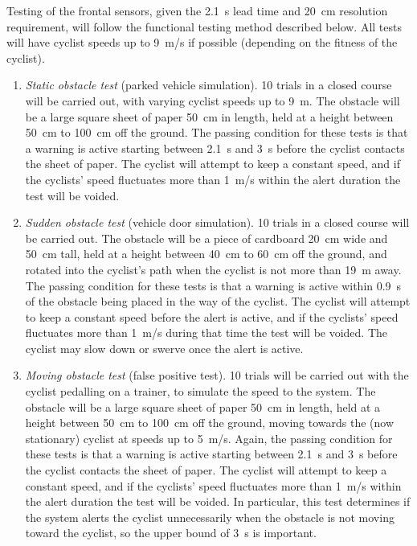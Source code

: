 \documentclass[journal]{IEEEtran}
\begin{document}
Testing of the frontal sensors, given the \SI{2.1}{\s} lead time and \SI{20}{\cm} resolution requirement, will follow the functional testing method described below. All tests will have cyclist speeds up to \SI{9}{\meter/\s} if possible (depending on the fitness of the cyclist). 

\begin{enumerate}
    \item \textit{Static obstacle test} (parked vehicle simulation). 10 trials in a closed course will be carried out, with varying cyclist speeds up to \SI{9}{\meter}. The obstacle will be a large square sheet of paper \SI{50}{\cm} in length, held at a height between \SI{50}{\cm} to \SI{100}{\cm} off the ground. The passing condition for these tests is that a warning is active starting between \SI{2.1}{\s} and \SI{3}{\s} before the cyclist contacts the sheet of paper. The cyclist will attempt to keep a constant speed, and if the cyclists' speed fluctuates more than \SI{1}{\meter/\s} within the alert duration the test will be voided.
    
    \item \textit{Sudden obstacle test} (vehicle door simulation). 10 trials in a closed course will be carried out. The obstacle will be a piece of cardboard \SI{20}{\cm} wide and \SI{50}{\cm} tall, held at a height between \SI{40}{\cm} to \SI{60}{\cm} off the ground, and rotated into the cyclist's path when the cyclist is not more than \SI{19}{\meter} away. The passing condition for these tests is that a warning is active within \SI{0.9}{\s} of the obstacle being placed in the way of the cyclist. The cyclist will attempt to keep a constant speed before the alert is active, and if the cyclists' speed fluctuates more than \SI{1}{\meter/\s} during that time the test will be voided. The cyclist may slow down or swerve once the alert is active.
    
    \item \textit{Moving obstacle test} (false positive test). 10 trials will be carried out with the cyclist pedalling on a trainer, to simulate the speed to the system. The obstacle will be a large square sheet of paper \SI{50}{\cm} in length, held at a height between \SI{50}{\cm} to \SI{100}{\cm} off the ground, moving towards the (now stationary) cyclist at speeds up to \SI{5}{\meter/\s}. Again, the passing condition for these tests is that a warning is active starting between \SI{2.1}{\s} and \SI{3}{\s} before the cyclist contacts the sheet of paper. The cyclist will attempt to keep a constant speed, and if the cyclists' speed fluctuates more than \SI{1}{\meter/\s} within the alert duration the test will be voided. In particular, this test determines if the system alerts the cyclist unnecessarily when the obstacle is not moving toward the cyclist, so the upper bound of \SI{3}{\s} is important.
\end{enumerate}
\end{document}

